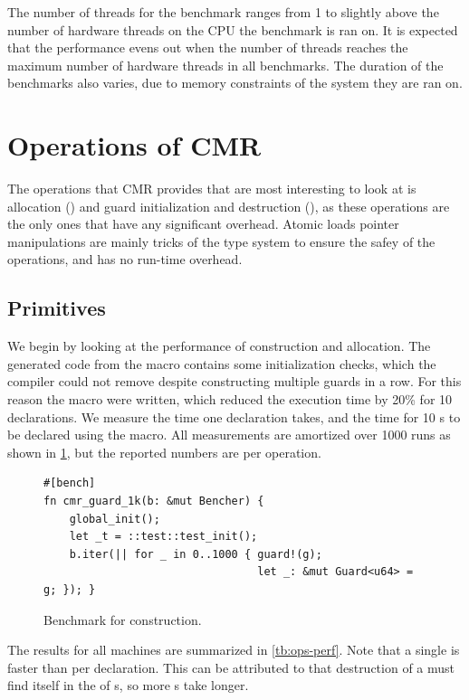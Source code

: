 The number of threads for the benchmark ranges from 1 to slightly above the number of hardware
threads on the CPU the benchmark is ran on. It is expected that the performance evens out when the
number of threads reaches the maximum number of hardware threads in all benchmarks. The duration of
the benchmarks also varies, due to memory constraints of the system they are ran on.


\section{Operations of CMR\label{ch:res-ops}}

The operations that CMR provides that are most interesting to look at is allocation
() and guard initialization and destruction (), as these operations
are the only ones that have any significant overhead. Atomic loads pointer manipulations are mainly
tricks of the type system to ensure the safey of the operations, and has no run-time overhead.


\subsection{Primitives}

We begin by looking at the performance of  construction and allocation.  The generated
code from the  macro contains some initialization checks, which the compiler could not
remove despite constructing multiple guards in a row. For this reason the  macro were
written, which reduced the execution time by 20\% for 10 declarations.  We measure the time one
 declaration takes, and the time for 10 s to be declared using the
 macro.  All measurements are amortized over 1000 runs as shown in
\cref{lst:guard-bench}, but the reported numbers are per operation.

\begin{figure}[ht]
\begin{lstlisting}[style=Rust]
#[bench]
fn cmr_guard_1k(b: &mut Bencher) {
    global_init();
    let _t = ::test::test_init();
    b.iter(|| for _ in 0..1000 { guard!(g);
                                 let _: &mut Guard<u64> = g; }); }
\end{lstlisting}
  \caption{Benchmark for  construction.\label{lst:guard-bench}}
\end{figure}

The results for all machines are summarized in \cref{tb:ops-perf}.
Note that a single  is faster than  per declaration. This can be
attributed to that destruction of a  must find itself in the  of
s, so more s take longer.

